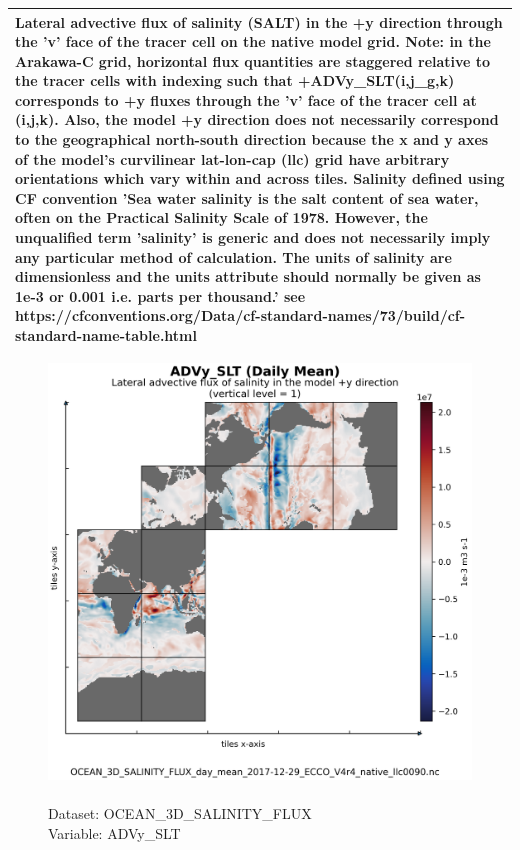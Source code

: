 \begin{longtable}{|p{}|p{}|p{}|p{}|}
\multicolumn{4}{|p{1\textwidth}|}{Lateral advective flux of salinity (SALT) in the +y direction through the 'v' face of the tracer cell on the native model grid. Note: in the Arakawa-C grid, horizontal flux quantities are staggered relative to the tracer cells with indexing such that +ADVy\_SLT(i,j\_g,k) corresponds to +y fluxes through the 'v' face of the tracer cell at (i,j,k). Also, the model +y direction does not necessarily correspond to the geographical north-south direction because the x and y axes of the model's curvilinear lat-lon-cap (llc) grid have arbitrary orientations which vary within and across tiles. Salinity defined using CF convention 'Sea water salinity is the salt content of sea water, often on the Practical Salinity Scale of 1978. However, the unqualified term 'salinity' is generic and does not necessarily imply any particular method of calculation. The units of salinity are dimensionless and the units attribute should normally be given as 1e-3 or 0.001 i.e. parts per thousand.' see https://cfconventions.org/Data/cf-standard-names/73/build/cf-standard-name-table.html} \\ \hline
\end{longtable}

\begin{figure}[H]
\centering
\includegraphics[scale=0.5]{../images/plots/native_plots/Ocean_Three-Dimensional_Salinity_Fluxes/ADVy_SLT.png}
\caption{\\Dataset: OCEAN\_3D\_SALINITY\_FLUX\\Variable: ADVy\_SLT}
\label{tab:table-OCEAN_3D_SALINITY_FLUX_ADVy_SLT-Plot}
\end{figure}
\pagebreak
